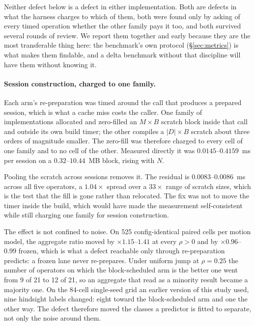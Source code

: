 \documentclass{article}
\begin{document}
Neither defect below is a defect in either implementation. Both are defects in
what the harness charges to which of them, both were found only by asking of
every timed operation whether the other family pays it too, and both survived
several rounds of review. We report them together and early because they are the
most transferable thing here: the benchmark's own protocol (\S\ref{sec:metrics})
is what makes them findable, and a delta benchmark without that discipline will
have them without knowing it.

\paragraph{Session construction, charged to one family.}
Each arm's re-preparation was timed around the call that produces a prepared
session, which is what a cache miss costs the caller. One family of
implementations allocated and zero-filled an $M \times B$ scratch block inside
that call and outside its own build timer; the other compiles a $|D| \times B$
scratch about three orders of magnitude smaller. The zero-fill was therefore
charged to every cell of one family and to no cell of the other. Measured
directly it was $0.0145$--$0.4159$~ms per session on a $0.32$--$10.44$~MB block,
rising with $N$.

Pooling the scratch across sessions removes it. The residual is
$0.0083$--$0.0086$~ms across all five operators, a $1.04\times$ spread over a
$33\times$ range of scratch sizes, which is the test that the fill is gone rather
than relocated. The fix was not to move the timer inside the build, which would
have made the measurement self-consistent while still charging one family for
session construction.

The effect is not confined to noise. On 525 config-identical paired cells per
motion model, the aggregate ratio moved by $\times1.15$--$1.41$ at every $\rho>0$
and by $\times0.96$--$0.99$ frozen, which is what a defect reachable only through
re-preparation predicts: a frozen lane never re-prepares. Under uniform jump at
$\rho{=}0.25$ the number of operators on which the block-scheduled arm is the
better one went from 9 of 21 to 12 of 21, so an aggregate that read as a minority
result became a majority one. On the 84-cell single-seed grid an earlier version
of this study used, nine hindsight labels changed: eight toward the
block-scheduled arm and one the other way. The defect therefore moved the
classes a predictor is fitted to separate, not only the noise around them.
\end{document}
